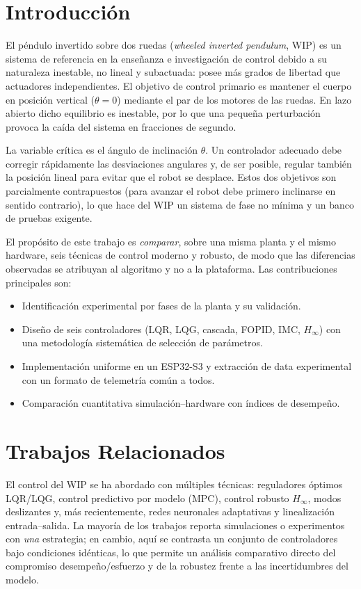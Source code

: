 \documentclass[conference]{IEEEtran}
\begin{document}
\section{Introducci\'on}
El p\'endulo invertido sobre dos ruedas (\textit{wheeled inverted pendulum},
WIP) es un sistema de referencia en la ense\~nanza e investigaci\'on de control
debido a su naturaleza inestable, no lineal y subactuada: posee m\'as grados de
libertad que actuadores independientes. El objetivo de control primario es
mantener el cuerpo en posici\'on vertical ($\theta=0$) mediante el par de los
motores de las ruedas. En lazo abierto dicho equilibrio es inestable, por lo que
una peque\~na perturbaci\'on provoca la ca\'ida del sistema en fracciones de
segundo.

La variable cr\'itica es el \'angulo de inclinaci\'on $\theta$. Un controlador
adecuado debe corregir r\'apidamente las desviaciones angulares y, de ser posible,
regular tambi\'en la posici\'on lineal para evitar que el robot se desplace. Estos
dos objetivos son parcialmente contrapuestos (para avanzar el robot debe primero
inclinarse en sentido contrario), lo que hace del WIP un sistema de fase no
m\'inima y un banco de pruebas exigente.

El prop\'osito de este trabajo es \emph{comparar}, sobre una misma planta y el
mismo hardware, seis t\'ecnicas de control moderno y robusto, de modo que las
diferencias observadas se atribuyan al algoritmo y no a la plataforma. Las
contribuciones principales son:
\begin{itemize}
\item Identificaci\'on experimental por fases de la planta y su validaci\'on.
\item Dise\~no de seis controladores (LQR, LQG, cascada, FOPID, IMC, $H_\infty$)
con una metodolog\'ia sistem\'atica de selecci\'on de par\'ametros.
\item Implementaci\'on uniforme en un ESP32-S3 y extracci\'on de data
experimental con un formato de telemetr\'ia com\'un a todos.
\item Comparaci\'on cuantitativa simulaci\'on--hardware con \'indices de desempe\~no.
\end{itemize}

\section{Trabajos Relacionados}
El control del WIP se ha abordado con m\'ultiples t\'ecnicas: reguladores
\'optimos LQR/LQG, control predictivo por modelo (MPC), control robusto
$H_\infty$, modos deslizantes y, m\'as recientemente, redes neuronales adaptativas
y linealizaci\'on entrada--salida. La mayor\'ia de los trabajos reporta
simulaciones o experimentos con \emph{una} estrategia; en cambio, aqu\'i se
contrasta un conjunto de controladores bajo condiciones id\'enticas, lo que
permite un an\'alisis comparativo directo del compromiso desempe\~no/esfuerzo y de
la robustez frente a las incertidumbres del modelo.
\end{document}
